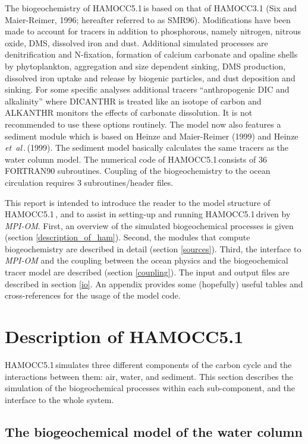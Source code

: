 \documentclass[11pt,a4paper,fleqn,twoside]{article}
\newcommand{\etal}{{\em et~al\,}.\,}
\newcommand{\ham}{HAMOCC5.1\,}
\begin{document}
The biogeochemistry of \ham is based on that of HAMOCC3.1 (Six and
Maier-Reimer, 1996\nocite{six:1996}; hereafter referred to as SMR96). 
Modifications have been made to account for tracers in addition to phosphorous,
namely nitrogen, nitrous oxide, DMS, dissolved iron and dust. 
 Additional simulated processes are denitrification and
N-fixation, formation of calcium carbonate and opaline shells by phytoplankton,
aggregation and size dependent sinking, DMS production, dissolved iron uptake
and release by biogenic particles, and dust deposition and sinking. For
some  specific analyses additional tracers ``anthropogenic DIC and alkalinity''
where DICANTHR is treated like an isotope of carbon and ALKANTHR monitors the
effects of carbonate dissolution. It is not recommended to use these options
routinely. The model
now also features a sediment module which is based on  Heinze and
Maier-Reimer (1999)\nocite{heinze:1999b} and Heinze \etal (1999)\nocite{heinze:1999a}. 
The sediment model basically calculates the same tracers as the 
water column model. The numerical code of \ham consists of 36 FORTRAN90
subroutines. Coupling of the biogeochemistry to the ocean circulation requires 3
subroutines/header files.  

This report is intended to introduce the reader to the model structure of \ham, and to
assist in setting-up and running \ham driven by {\em MPI-OM}.  First, an
overview of the simulated biogeochemical processes is given (section
\ref{description_of_ham}). Second, the modules that compute biogeochemistry are
described in detail (section \ref{sources}). Third, the interface to 
{\em MPI-OM} and the coupling between the ocean physics
and the biogeochemical tracer model are described (section \ref{coupling}). The
input and output files are described in section \ref{io}. 
An appendix provides some (hopefully) useful tables
and cross-references for the usage of the model code.  



\section{\label{description_of_ham} Description of \ham}

\ham simulates three different components of the carbon cycle
and the interactions between them: air, water, and sediment. 
This section describes the simulation of the
biogeochemical processes within each sub-component, and the interface
to the whole system. 

\subsection{\label{the_water_column_bgc_model}The biogeochemical model of the water column}
\end{document}
